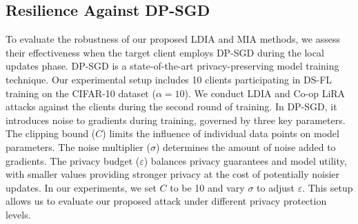 \subsection{Resilience Against DP-SGD}
To evaluate the robustness of our proposed LDIA and MIA methods, we assess their effectiveness when the target client employs DP-SGD\cite{abadi2016deep} during the local updates phase. 
DP-SGD is a state-of-the-art privacy-preserving model training technique.
Our experimental setup includes 10 clients participating in DS-FL training on the CIFAR-10 dataset ($\alpha=10$). We conduct LDIA and Co-op LiRA attacks against the clients during the second round of training.
In DP-SGD, it introduces noise to gradients during training, governed by three key parameters. 
The clipping bound ($C$) limits the influence of individual data points on model parameters. 
The noise multiplier ($\sigma$) determines the amount of noise added to gradients. 
The privacy budget ($\varepsilon$) balances privacy guarantees and model utility, with smaller values providing stronger privacy at the cost of potentially noisier updates.
In our experiments, we set $C$ to be 10 and vary $\sigma$ to adjust $\varepsilon$. 
This setup allows us to evaluate our proposed attack under different privacy protection levels.
\begin{table}[h]
    \caption{Performance of MIA and LDIA against DP-SGD for DS-FL trained on CIFAR-10.}
    \scriptsize
    \label{tab:DP}
\end{table}



